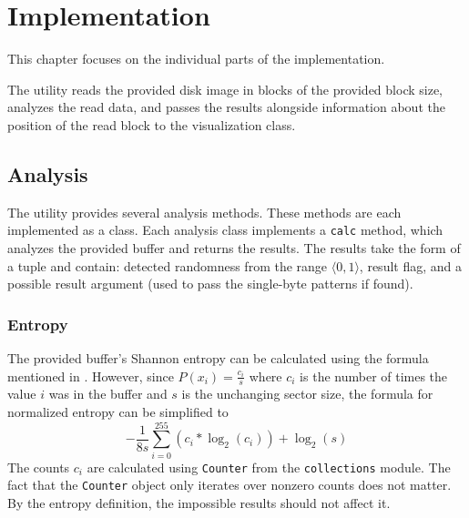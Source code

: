 \documentclass[
  digital, %
  oneside, %
  lof,     %
  lot,     %
]{fithesis4}
\begin{document}
\chapter{Implementation}
This chapter focuses on the individual parts of the implementation.

The utility reads the provided disk image in blocks of the provided block size, analyzes the read data, and passes the results alongside information about the position of the read block to the visualization class.

\section{Analysis}
The utility provides several analysis methods.
These methods are each implemented as a class.
Each analysis class implements a \texttt{calc} method, which analyzes the provided buffer and returns the results.
The results take the form of a tuple and contain: detected randomness from the range $\langle0,1\rangle$, result flag, and a possible result argument (used to pass the single-byte patterns if found).

\subsection{Entropy}

The provided buffer's Shannon entropy can be calculated using the formula mentioned in \textbf{}.
However, since $P(x_i) = \frac{c_i}{s}$ where $c_i$ is the number of times the value $i$ was in the buffer and $s$ is the unchanging sector size, the formula for normalized entropy can be simplified to
$$-\frac{1}{8s}\sum_{i=0}^{255}(c_i * \log_2(c_i)) + \log_2(s)$$
The counts $c_i$ are calculated using \texttt{Counter} from the \texttt{collections} module\cite{collections}.
The fact that the \texttt{Counter} object only iterates over nonzero counts does not matter.
By the entropy definition, the impossible results should not affect it.
\end{document}
